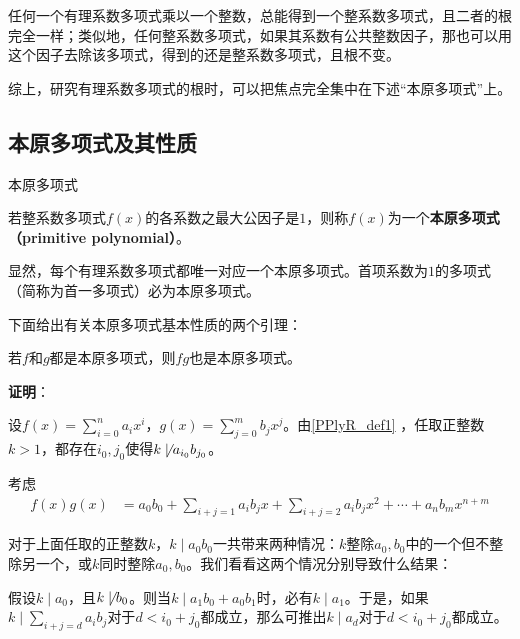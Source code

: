 

任何一个有理系数多项式乘以一个整数，总能得到一个整系数多项式，且二者的根完全一样；类似地，任何整系数多项式，如果其系数有公共整数因子，那也可以用这个因子去除该多项式，得到的还是整系数多项式，且根不变。

综上，研究有理系数多项式的根时，可以把焦点完全集中在下述“本原多项式”上。


\subsection{本原多项式及其性质}


\begin{definition}{本原多项式}\label{PPlyR_def1}

若整系数多项式$f(x)$的各系数之最大公因子是$1$，则称$f(x)$为一个\textbf{本原多项式（primitive polynomial）}。

\end{definition}

显然，每个有理系数多项式都唯一对应一个本原多项式。首项系数为$1$的多项式（简称为首一多项式）必为本原多项式。

下面给出有关本原多项式基本性质的两个引理：

\begin{lemma}{}\label{PPlyR_lem1}
若$f$和$g$都是本原多项式，则$fg$也是本原多项式。
\end{lemma}

\textbf{证明}：

设$f(x) = \sum_{i=0}^n a_ix^i$，$g(x) = \sum_{j=0}^m b_jx^j$。由\autoref{PPlyR_def1} ，任取正整数$k>1$，都存在$i_0, j_0$使得$k\not\mid a_{i_0}b_{j_0}$。

考虑
\begin{equation}\label{PPlyR_eq1}
\begin{aligned}
f(x)g(x) &= a_0b_0 + \sum_{i+j=1}a_ib_jx + \sum_{i+j=2}a_ib_jx^2+\cdots +a_nb_mx^{n+m}
\end{aligned}
\end{equation}

对于上面任取的正整数$k$，$k\mid a_0b_0$一共带来两种情况：$k$整除$a_0, b_0$中的一个但不整除另一个，或$k$同时整除$a_0, b_0$。我们看看这两个情况分别导致什么结果：

假设$k\mid a_0$，且$k\not\mid b_0$。则当$k\mid a_1b_0+a_0b_1$时，必有$k\mid a_1$。于是，如果$k\mid\sum_{i+j=d}a_ib_j$对于$d<i_0+j_0$都成立，那么可推出$k\mid a_d$对于$d<i_0+j_0$都成立。

